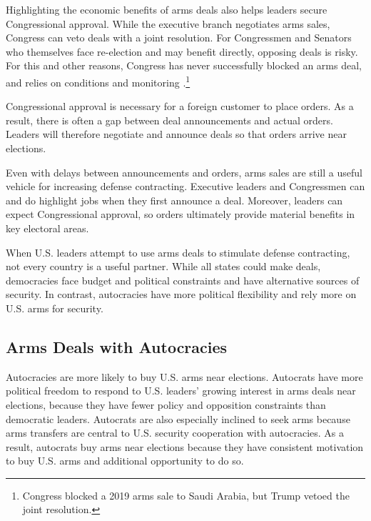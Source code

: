 \documentclass[12pt]{article}
\begin{document}
Highlighting the economic benefits of arms deals also helps leaders secure Congressional approval. 
While the executive branch negotiates arms sales, Congress can veto deals with a joint resolution. 
For Congressmen and Senators who themselves face re-election and may benefit directly, opposing deals is risky.
For this and other reasons, Congress has never successfully blocked an arms deal, and relies on conditions and monitoring \citep{Thralletal2020}.\footnote{Congress blocked a 2019 arms sale to Saudi Arabia, but Trump vetoed the joint resolution.}


Congressional approval is necessary for a foreign customer to place orders. 
As a result, there is often a gap between deal announcements and actual orders.
Leaders will therefore negotiate and announce deals so that orders arrive near elections.  


Even with delays between announcements and orders, arms sales are still a useful vehicle for increasing defense contracting. 
Executive leaders and Congressmen can and do highlight jobs when they first announce a deal. 
Moreover, leaders can expect Congressional approval, so orders ultimately provide material benefits in key electoral areas. 


When U.S. leaders attempt to use arms deals to stimulate defense contracting, not every country is a useful partner. 
While all states could make deals, democracies face budget and political constraints and have alternative sources of security.
In contrast, autocracies have more political flexibility and rely more on U.S. arms for security.



\subsection{Arms Deals with Autocracies}


Autocracies are more likely to buy U.S. arms near elections. 
Autocrats have more political freedom to respond to U.S. leaders' growing interest in arms deals near elections, because they have fewer policy and opposition constraints than democratic leaders. 
Autocrats are also especially inclined to seek arms because arms transfers are central to U.S. security cooperation with autocracies.
As a result, autocrats buy arms near elections because they have consistent motivation to buy U.S. arms and additional opportunity to do so. 
\end{document}
